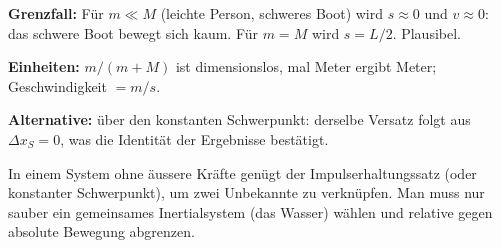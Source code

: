 \begin{kontrolle}
\textbf{Grenzfall:} Für $m\ll M$ (leichte Person, schweres Boot) wird $s
\approx 0$ und $v\approx 0$: das schwere Boot bewegt sich kaum. Für $m=M$
wird $s=L/2$. Plausibel.

\textbf{Einheiten:} $m/(m+M)$ ist dimensionslos, mal Meter ergibt Meter;
Geschwindigkeit $= m/s$. \checkmark

\textbf{Alternative:} über den konstanten Schwerpunkt: derselbe Versatz folgt
aus $\Delta x_S=0$, was die Identität der Ergebnisse bestätigt.
\end{kontrolle}

\begin{merksatz}
In einem System ohne äussere Kräfte genügt der Impulserhaltungssatz (oder
konstanter Schwerpunkt), um zwei Unbekannte zu verknüpfen. Man muss nur
sauber ein gemeinsames Inertialsystem (das Wasser) wählen und relative gegen
absolute Bewegung abgrenzen.
\end{merksatz}
